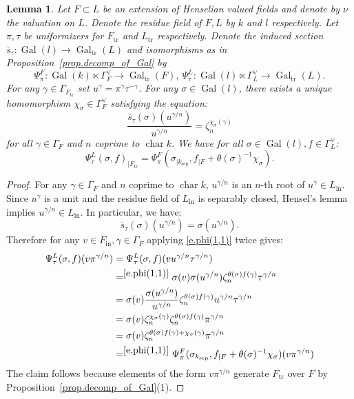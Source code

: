 \documentclass[12pt]{amsart}
\numberwithin{equation}{section}
\newtheorem{lemma}[theorem]{Lemma}
\theoremstyle{definition}
\newcommand{\Gal}{\operatorname{Gal}}
\newcommand{\sep}{\operatorname{sep}}
\newcommand{\Char}{\operatorname{char}}
\newcommand{\tr}{\operatorname{tr}}
\newcommand{\ksep}{k_{\sep}}
\newcommand{\Ftr}{F_{\tr}}
\newcommand{\Ltr}{L_{\tr}}
\newcommand{\oin}{\operatorname{in}}
\newcommand{\Fin}{F_{\oin}}
\newcommand{\Lin}{L_{\oin}}
\newcommand{\Galtr}{\Gal_{\tr}}
\newcommand{\I}[1]{\Gamma_{#1}^{\vee}}
\begin{document}
\begin{lemma}\label{lem.func_Galois_dec}
    Let $F\subset L$ be an extension of Henselian valued fields and denote by $\nu$ the valuation on $L$. Denote the residue field of $F, L$ by $k$ and $l$ respectively. Let $\pi,\tau$ be uniformizers for $\Ftr$ and $\Ltr$ respectively. Denote the induced section $\overline{s}_\tau : \Gal(l) \to \Galtr(L)$ and isomorphisms as in Proposition~\ref{prop.decomp_of_Gal} by $$\Psi^F_\pi: \Gal(k)\ltimes \I{F} \to \Galtr(F),\  \Psi^L_\tau: \Gal(l)\ltimes \I{L} \to \Galtr(L).$$
    For any $\gamma\in \Gamma_{\Ftr}$ set $u^\gamma = \pi^{\gamma} \tau^{-\gamma}$. For any $\sigma\in \Gal(l)$, there exists a unique homomorphism $\chi_\sigma\in \I{F}$ satisfying the equation:
    \begin{equation}\label{e.25}
    \frac{\overline{s}_\tau(\sigma)(u^{\gamma/n})}{u^{\gamma/n}}= \zeta^{\chi_\sigma(\gamma)}_n
    \end{equation}
    for all $\gamma\in \Gamma_F$ and $n$ coprime to $\Char k$. 
    We have for all $\sigma \in \Gal(l), f\in \I{L}$:
        $$\Psi^L_\tau(\sigma,f)_{|\Ftr} = \Psi^F_\pi(\sigma_{|\ksep},f_{|F} + \theta(\sigma)^{-1} \chi_\sigma).$$
    
\end{lemma}
\begin{proof} For any  $\gamma\in \Gamma_F$ and $n$ coprime to $\Char k$, $u^{\gamma/n}$ is an $n$-th root of $u^\gamma\in \Lin$. Since $u^\gamma$ is a unit and the residue field of $\Lin$ is separably closed, Hensel's lemma implies $u^{\gamma/n} \in \Lin$. In particular, we have:
$$\overline{s}_\tau(\sigma)(u^{\gamma/n}) = \sigma(u^{\gamma/n}).$$
Therefore for any $v\in \Fin, \gamma\in \Gamma_F$  applying \eqref{e.phi(1,1)} twice gives: 
\begin{align*}
 \Psi^L_{\tau}(\sigma,f)(v\pi^{\gamma/n}) &= \Psi^L_{\tau}(\sigma,f)(vu^{\gamma/n}\tau^{\gamma/n}) \\
 &=^{\eqref{e.phi(1,1)}} \sigma(v) \sigma(u^{\gamma/n}) \zeta_n^{\theta(\sigma)f(\gamma)} \tau^{\gamma/n} \\
 &= \sigma(v) \frac{\sigma(u^{\gamma/n})}{u^{\gamma/n}} \zeta_n^{\theta(\sigma)f(\gamma)} u^{\gamma/n}\tau^{\gamma/n}\\
 &= \sigma(v) \zeta_n^{\chi_\sigma(\gamma)} \zeta_n^{\theta(\sigma)f(\gamma)}  \pi^{\gamma/n} \\
&= \sigma(v) \zeta_n^{\theta(\sigma)f(\gamma) + \chi_\sigma(\gamma)} \pi^{\gamma/n} \\
&=^{\eqref{e.phi(1,1)}}\Psi_\pi^F(\sigma_{\ksep},f_{|F}+\theta(\sigma)^{-1} \chi_\sigma)(v\pi^{\gamma/n})
\end{align*}
The claim follows because elements of the form $v\pi^{\gamma/n}$ generate $\Ftr$ over $F$ by Proposition~\ref{prop.decomp_of_Gal}(1).
\end{proof}
\end{document}
